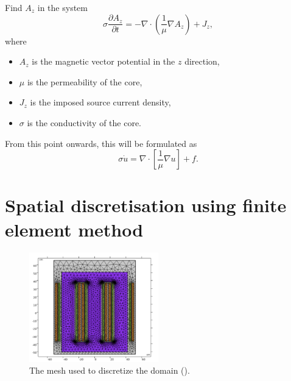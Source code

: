\begin{problem}
    Find $A_z$ in the system
    \begin{equation}
        \sigma\frac{\partial A_z}{\partial t} = - \nabla \cdot \left(\frac{1}{\mu} \nabla A_z \right) + J_z,
    \end{equation}
    where
    \begin{itemize}
        \item $A_z$ is the magnetic vector potential in the $z$ direction,
        \item $\mu$ is the permeability of the core,
        \item $J_z$ is the imposed source current density,
        \item $\sigma$ is the conductivity of the core.
    \end{itemize}
    From this point onwards, this will be formulated as
    \begin{equation}
        \sigma\dot u = \nabla \cdot \left[\frac{1}{\mu}\nabla u\right] + f.
    \end{equation}
\end{problem}

\newpage
\section{Spatial discretisation using finite element method}

\begin{figure}
    \centering
    \includegraphics[width=0.5\textwidth]{img/regular_mesh.png}
    \caption{The mesh used to discretize the domain (\cite{vanDijk2022}).}
    \label{fig:regular_mesh}
\end{figure}

